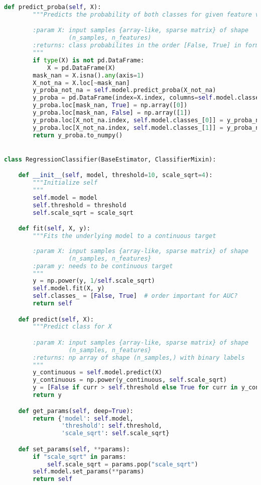 \begin{lstlisting}[language=Python, basicstyle=\scriptsize, tabsize=4]
    def predict_proba(self, X):
        """Predicts the probability of both classes for given feature vectors

        :param X: input samples {array-like, sparse matrix} of shape
        		  (n_samples, n_features)
        :returns: class probabilites in the order [False, True] in form (n_samples,2)
        """
        if type(X) is not pd.DataFrame:
            X = pd.DataFrame(X)
        mask_nan = X.isna().any(axis=1)
        X_not_na = X.loc[~mask_nan]
        y_proba_not_na = self.model.predict_proba(X_not_na)
        y_proba = pd.DataFrame(index=X.index, columns=self.model.classes_)
        y_proba.loc[mask_nan, True] = np.array([0])
        y_proba.loc[mask_nan, False] = np.array([1])
        y_proba.loc[X_not_na.index, self.model.classes_[0]] = y_proba_not_na[:, 0]
        y_proba.loc[X_not_na.index, self.model.classes_[1]] = y_proba_not_na[:, 1]
        return y_proba.to_numpy()


class RegressionClassifier(BaseEstimator, ClassifierMixin):

    def __init__(self, model, threshold=10, scale_sqrt=4):
        """Initialize self
        """
        self.model = model
        self.threshold = threshold
        self.scale_sqrt = scale_sqrt

    def fit(self, X, y):
        """Fits the underlying model to a continuous target
        
        :param X: input samples {array-like, sparse matrix} of shape
        		  (n_samples, n_features}
        :param y: needs to be continuous target
        """
        y = np.power(y, 1/self.scale_sqrt)
        self.model.fit(X, y)
        self.classes_ = [False, True]  # order important for AUC?
        return self

    def predict(self, X):
        """Predict class for X

        :param X: input samples {array-like, sparse matrix} of shape
        		  (n_samples, n_features}
        :returns: np array of shape (n_samples,) with binary labels
        """
        y_continuous = self.model.predict(X)
        y_continuous = np.power(y_continuous, self.scale_sqrt)
        y = [False if curr > self.threshold else True for curr in y_continuous]
        return y

    def get_params(self, deep=True):
        return {'model': self.model,
                'threshold': self.threshold,
                'scale_sqrt': self.scale_sqrt}

    def set_params(self, **params):
        if "scale_sqrt" in params:
            self.scale_sqrt = params.pop("scale_sqrt")
        self.model.set_params(**params)
        return self


\end{lstlisting}

